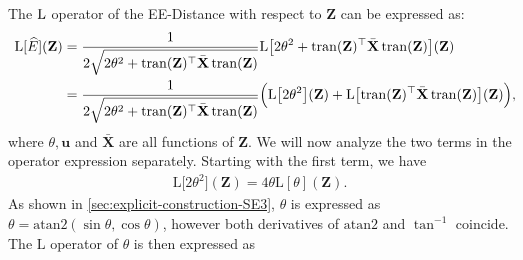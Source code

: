 The $\operatorname{L}$ operator of the EE-Distance with respect to $\mathbf{Z}$ can be expressed as:
\begin{align}
    \begin{split}
        \text{L}[\widehat{E}](\mathbf{Z}) &=  \frac{1}{2\sqrt{2\theta^2 + \operatorname{tran}(\mathbf{Z})^\top\bar{\mathbf{X}}\operatorname{tran}(\mathbf{Z})}} \text{L}\bigl[2\theta^2 + \operatorname{tran}(\mathbf{Z})^\top\bar{\mathbf{X}}\operatorname{tran}(\mathbf{Z})\bigr](\mathbf{Z}) \\
        &= \frac{1}{2\sqrt{2\theta^2 + \operatorname{tran}(\mathbf{Z})^\top\bar{\mathbf{X}}\operatorname{tran}(\mathbf{Z})}} \Bigl(\text{L}\bigl[2\theta^2\bigr](\mathbf{Z}) + \text{L}\bigl[\operatorname{tran}(\mathbf{Z})^\top\bar{\mathbf{X}}\operatorname{tran}(\mathbf{Z})\bigr](\mathbf{Z})\Bigr),\!\!\!\!\! \label{eq:explicit-derivative-SE3-LdhatZ-firststep}
    \end{split}
\end{align}
where $\theta, \mathbf{u}$ and $\bar{\mathbf{X}}$ are all functions of $\mathbf{Z}$. We will now analyze the two terms in the operator expression separately. Starting with the first term, we have
\begin{align}
    \text{L}\bigl[2\theta^2\bigr](\mathbf{Z}) = 4\theta \text{L}[\theta](\mathbf{Z}).
\end{align}
As shown in \cref{sec:explicit-construction-SE3}, $\theta$ is expressed as $\theta=\text{atan2}(\sin\theta, \cos\theta)$, however both derivatives of $\text{atan2}$ and $\tan^{-1}$ coincide. The $\text{L}$ operator of $\theta$ is then expressed as

